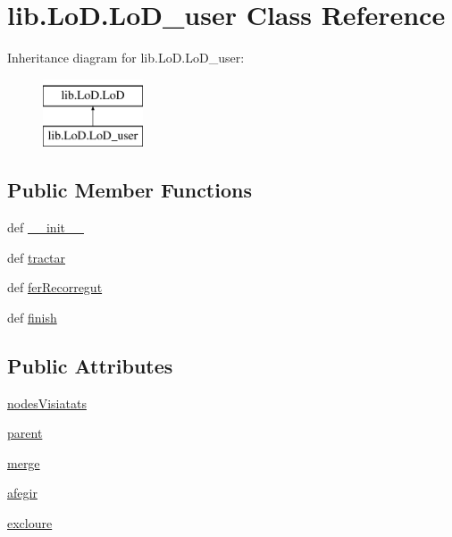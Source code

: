 \hypertarget{classlib_1_1_lo_d_1_1_lo_d__user}{\section{lib.\-Lo\-D.\-Lo\-D\-\_\-user Class Reference}
\label{classlib_1_1_lo_d_1_1_lo_d__user}
}
Inheritance diagram for lib.\-Lo\-D.\-Lo\-D\-\_\-user\-:\begin{figure}[H]
\begin{center}
\leavevmode
\includegraphics[height=2.000000cm]{classlib_1_1_lo_d_1_1_lo_d__user}
\end{center}
\end{figure}
\subsection*{Public Member Functions}
\begin{DoxyCompactItemize}
\item 
def \hyperlink{classlib_1_1_lo_d_1_1_lo_d__user_a0173ea1d7c0e4022f324937901d82487}{\-\_\-\-\_\-init\-\_\-\-\_\-}
\item 
def \hyperlink{classlib_1_1_lo_d_1_1_lo_d__user_a9a21828e634524531f11160cd8a7c5aa}{tractar}
\item 
def \hyperlink{classlib_1_1_lo_d_1_1_lo_d__user_ad6c34cfc12a4f4e1c3a34518237432ee}{fer\-Recorregut}
\item 
def \hyperlink{classlib_1_1_lo_d_1_1_lo_d__user_a78bb4441e6ebab2e055064fb0af65e1f}{finish}
\end{DoxyCompactItemize}
\subsection*{Public Attributes}
\begin{DoxyCompactItemize}
\item 
\hyperlink{classlib_1_1_lo_d_1_1_lo_d__user_a7de3b2dcf364d63f808f39b9154c4a30}{nodes\-Visiatats}
\item 
\hyperlink{classlib_1_1_lo_d_1_1_lo_d__user_a71fae9e48d7b735bce5ed983c79bdfe5}{parent}
\item 
\hyperlink{classlib_1_1_lo_d_1_1_lo_d__user_a6c143a99cb426fccf4e1aa450d1f9b37}{merge}
\item 
\hyperlink{classlib_1_1_lo_d_1_1_lo_d__user_ab9b0fb5663bf67ebefdfe467697be65a}{afegir}
\item 
\hyperlink{classlib_1_1_lo_d_1_1_lo_d__user_a3574ccbac25f029b2d4cb7f66f0ddea7}{excloure}
\end{DoxyCompactItemize}


